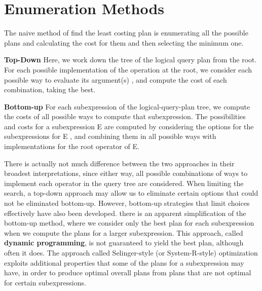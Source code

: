 \section{Enumeration Methods}
The naive method of find the least costing plan is enumerating all the possible plans and calculating the cost for them and then selecting the minimum one.
\par \textbf{Top-Down} Here, we work down the tree of the logical query plan from the root. For each possible implementation of the operation at the root, we consider each possible way to evaluate its argument(s) , and compute the cost of each combination, taking the best.
\par \textbf{Bottom-up} For each subexpression of the logical-query-plan tree, we com­pute the costs of all possible ways to compute that subexpression. The possibilities and costs for a subexpression E are computed by consider­ing the options for the subexpressions for E , and combining them in all possible ways with implementations for the root operator of E.
\par There is actually not much difference between the two approaches in their broadest interpretations, since either way, all possible combinations of ways to implement each operator in the query tree are considered. When limiting the search, a top-down approach may allow us to eliminate certain options that could not be eliminated bottom-up. However, bottom-up strategies that limit choices effectively have also been developed. there is an apparent simplification of the bottom-up method, where we consider only the best plan for each subexpression when we compute the plans for a larger subexpression. This approach, called \textbf{dynamic programming}, is not guaranteed to yield the best plan, although often it does. The approach called Selinger-style (or System-R-style) optimization exploits additional properties that some of the plans for a subexpression may have, in order to produce optimal overall plans from plans that are not optimal for certain subexpressions.

